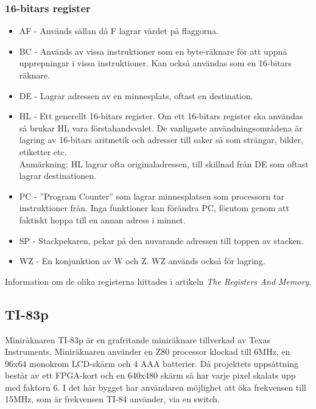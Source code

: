\documentclass[main.tex]{subfiles}
\begin{document}
\subsubsection{16-bitars register}
\begin{itemize}
    \item AF - Används sällan då F lagrar värdet på flaggorna.
    \item BC - Används av vissa instruktioner som en byte-räknare för att uppnå
    upprepningar i vissa instruktioner. Kan också användas som en 16-bitars
    räknare.
    \item DE - Lagrar adressen av en minnesplats, oftast en destination.
    \item HL - Ett generellt 16-bitars register. Om ett 16-bitars register ska
    användas så brukar HL vara förstahandsvalet. De vanligaste
    användningsområdena är lagring av 16-bitars aritmetik och adresser till
    saker så som strängar, bilder, etiketter etc.\\
    Anmärkning: HL lagrar ofta originaladressen, till skillnad från DE som
    oftast lagrar destinationen.
    \item PC - ''Program Counter'' som lagrar minnesplatsen som processorn tar
    instruktioner från. Inga funktioner kan förändra PC, förutom genom att
    faktiskt hoppa till en annan adress i minnet.
    \item SP - Stackpekaren, pekar på den nuvarande adressen till toppen av stacken.
    \item WZ - En konjunktion av W och Z. WZ används också för lagring.
\end{itemize}

Information om de olika registerna hittades i artikeln  \emph{The Registers And Memory}. \cite{regsandmem}

\subsection{TI-83p}
Miniräknaren TI-83p är en grafritande miniräknare tillverkad av Texas
Instruments. Miniräknaren använder en Z80 processor klockad till 6MHz, en 96x64
monokrom LCD-skärm och 4 AAA batterier. Då projektets uppsättning består av ett
FPGA-kort och en 640x480 skärm så har varje pixel skalats upp med faktorn 6. I
det här bygget har användaren möjlighet att öka frekvensen till 15MHz, som är
frekvensen TI-84 använder, via en switch.
\clearpage
\end{document}
